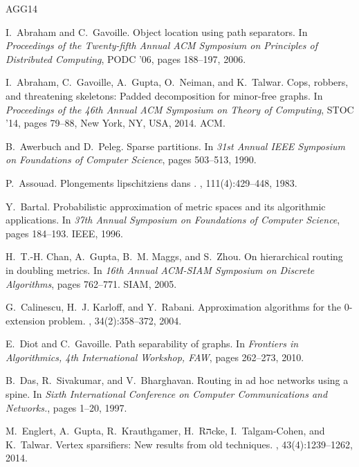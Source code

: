 \documentclass[11pt,fleqn]{article}
\begin{document}
\newcommand{\etalchar}[1]{}
\begin{thebibliography}{AGG{\etalchar{+}}14}

I.~Abraham and C.~Gavoille.
\newblock Object location using path separators.
\newblock In {\em Proceedings of the Twenty-fifth Annual ACM Symposium on
  Principles of Distributed Computing}, PODC '06, pages 188--197, 2006.

\bibitem[AGG{\etalchar{+}}14]{AGGNT14}
I.~Abraham, C.~Gavoille, A.~Gupta, O.~Neiman, and K.~Talwar.
\newblock Cops, robbers, and threatening skeletons: Padded decomposition for
  minor-free graphs.
\newblock In {\em Proceedings of the 46th Annual ACM Symposium on Theory of
  Computing}, STOC '14, pages 79--88, New York, NY, USA, 2014. ACM.

B.~Awerbuch and D.~Peleg.
\newblock Sparse partitions.
\newblock In {\em 31st Annual IEEE Symposium on Foundations of Computer
  Science}, pages 503--513, 1990.

P.~Assouad.
\newblock Plongements lipschitziens dans {}.
, 111(4):429--448, 1983.

Y.~Bartal.
\newblock Probabilistic approximation of metric spaces and its algorithmic
  applications.
\newblock In {\em 37th Annual Symposium on Foundations of Computer Science},
  pages 184--193. IEEE, 1996.

H.~T.-H. Chan, A.~Gupta, B.~M. Maggs, and S.~Zhou.
\newblock On hierarchical routing in doubling metrics.
\newblock In {\em 16th Annual ACM-SIAM Symposium on Discrete Algorithms}, pages
  762--771. SIAM, 2005.

G.~Calinescu, H.~J. Karloff, and Y.~Rabani.
\newblock Approximation algorithms for the 0-extension problem.
, 34(2):358--372, 2004.

E.~Diot and C.~Gavoille.
\newblock Path separability of graphs.
\newblock In {\em Frontiers in Algorithmics, 4th International Workshop,
  {FAW}}, pages 262--273, 2010.

B.~Das, R.~Sivakumar, and V.~Bharghavan.
\newblock Routing in ad hoc networks using a spine.
\newblock In {\em Sixth International Conference on Computer Communications and
  Networks.}, pages 1--20, 1997.

\bibitem[EGK{\etalchar{+}}14]{EGKRTT2010}
M.~Englert, A.~Gupta, R.~Krauthgamer, H.~Rהcke, I.~Talgam-Cohen, and
  K.~Talwar.
\newblock Vertex sparsifiers: New results from old techniques.
, 43(4):1239--1262, 2014.


\end{thebibliography}
\end{document}
